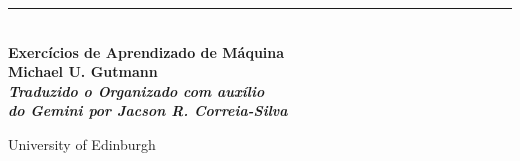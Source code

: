 %
%
%
%


\begin{titlepage} %
	
	\raggedleft %
	
	\rule{1pt}{\textheight} %
	\hspace{0.05\textwidth} %
	\parbox[b]{0.75\textwidth}{ %


    \\[\baselineskip]
    {\huge\bfseries Exerc\'icios de Aprendizado de M\'aquina}\\[4\baselineskip] %
		{\Large \bfseries Michael U. Gutmann \small \\ \textit{Traduzido o Organizado com auxílio} \\ \textit{do Gemini por Jacson R. Correia-Silva}}\\[\baselineskip]
		
		\vspace{0.5\textheight} %

    {\noindent University of Edinburgh}\\[\baselineskip]
	}

\end{titlepage}

